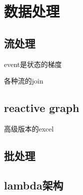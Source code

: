 \chapter{数据处理}


\section{流处理}
event是状态的梯度

各种流的join

\section{reactive graph}
高级版本的excel

\section{批处理}

\section{lambda架构}